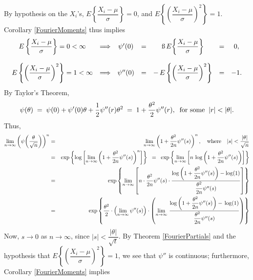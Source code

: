 \documentclass{article}
\begin{document}
By hypothesis on the $X_{i}$'s, $E\!\left\{\dfrac{X_{i}-\mu}{\sigma}\right\} = 0$, and $E\!\left\{\left(\dfrac{X_{i}-\mu}{\sigma}\right)^{2}\right\} = 1$.  Corollary \ref{FourierMoments} thus implies
\begin{equation*}
\begin{array}{ccccccc}
                                 E\left\{\dfrac{X_{i}-\mu}{\sigma}\right\}  = 0 < \infty
& \Longrightarrow & \psi'(0) &= & \i\,E\!\left\{\dfrac{X_{i} - \mu}{\sigma}\right\} &=& 0, \\ \\
                                 E\left\{\left(\dfrac{X_{i}-\mu}{\sigma}\right)^{2}\right\} = 1 < \infty
& \Longrightarrow & \psi''(0) &=&  - \, E\left\{\left(\dfrac{X_{i}-\mu}{\sigma}\right)^{2}\right\} &=& -1. \\
\end{array}
\end{equation*}
By Taylor's Theorem,
\begin{equation*}
\psi(\theta) \;=\; \psi(0) + \psi'(0)\theta + \dfrac{1}{2}\psi''(r)\theta^{2} \;=\; 1 + \dfrac{\theta^{2}}{2}\psi''(r),
\;\;\textnormal{for some}\;\; |r| < |\theta|.
\end{equation*}
Thus,
\begin{eqnarray*}
        \lim_{n\rightarrow\infty}\left(\psi\!\left(\frac{\theta}{\sqrt{n}}\right)\right)^{n}
&=& \lim_{n\rightarrow\infty}\left(1+\dfrac{\theta^{2}}{2n}\psi''(s)\right)^{n},
        \quad \textnormal{where}\quad |s| < \dfrac{|\theta|}{\sqrt{n}} \\
&=& \exp\left\{\log\left[\lim_{n\rightarrow\infty}\left(1+\dfrac{\theta^{2}}{2n}\psi''(s)\right)^{n}\right]\right\} 
\;\;=\;\; \exp\left\{\lim_{n\rightarrow\infty}\left[n\,\log\left(1+\dfrac{\theta^{2}}{2n}\psi''(s)\right)\right]\right\} \\
&=& \exp\left\{\lim_{n\rightarrow\infty}\left[n\cdot\dfrac{\theta^{2}}{2n}\psi''(s)\cdot\dfrac{\log\left(1+\dfrac{\theta^{2}}{2n}\psi''(s)\right)-\log(1)}{\dfrac{\theta^{2}}{2n}\psi''(s)}\right]\right\} \\
&=& \exp\left\{\dfrac{\theta^{2}}{2}\cdot\left(\lim_{n\rightarrow\infty}\psi''(s)\right)\cdot\left(\lim_{n\rightarrow\infty}\,\dfrac{\log\left(1+\dfrac{\theta^{2}}{2n}\psi''(s)\right)-\,\log(1)}{\dfrac{\theta^{2}}{2n}\psi''(s)}\right)\right\} \\
\end{eqnarray*}
Now, $s \rightarrow 0$ as $n \rightarrow\infty$, since $|s| < \dfrac{|\theta|}{\sqrt{t}}$.  By Theorem \ref{FourierPartials} and the hypothesis that $E\!\left\{\left(\dfrac{X_{i}-\mu}{\sigma}\right)^{2}\right\} = 1$, we see that $\psi''$ is continuous; furthermore, Corollary \ref{FourierMoments} implies
\end{document}
